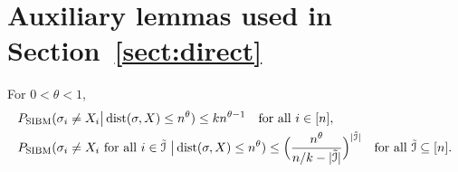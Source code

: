 \documentclass{article}
\begin{document}
\section{Auxiliary lemmas used in Section~\ref{sect:direct}}\label{ap:6}

\begin{lemma} \label{lm:bq}
	For $0<\theta<1$,
	\begin{align}
	& P_{\operatorname{SIBM}}(\sigma_i \neq X_i
	\big| \operatorname{dist}(\sigma,X) \le n^\theta) \le k n^{\theta-1}
	\quad \text{for all~} i\in[n] , \label{eq:l1}\\
	& P_{\operatorname{SIBM}}(\sigma_i \neq X_i \text{~for all~}  i\in\tilde{\mathcal{I}}
	~\big| \operatorname{dist}(\sigma,X) \le n^\theta) \le \Big(\frac{n^\theta}{n/k - |\tilde{\mathcal{I}}|}
	\Big)^{|\tilde{\mathcal{I}}|}
	\quad \text{for all~} \tilde{\mathcal{I}}\subseteq [n] .   \label{eq:l2}
	\end{align}
\end{lemma}
\end{document}
